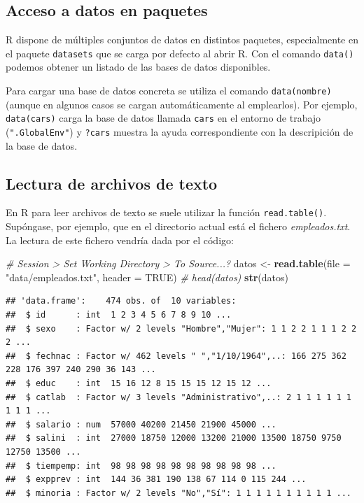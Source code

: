 \documentclass[]{book}
\newenvironment{Shaded}{\begin{snugshade}}{\end{snugshade}}
\newcommand{\CommentTok}[1]{\textcolor[rgb]{0.56,0.35,0.01}{\textit{#1}}}
\newcommand{\DataTypeTok}[1]{\textcolor[rgb]{0.13,0.29,0.53}{#1}}
\newcommand{\KeywordTok}[1]{\textcolor[rgb]{0.13,0.29,0.53}{\textbf{#1}}}
\newcommand{\NormalTok}[1]{#1}
\newcommand{\OtherTok}[1]{\textcolor[rgb]{0.56,0.35,0.01}{#1}}
\newcommand{\StringTok}[1]{\textcolor[rgb]{0.31,0.60,0.02}{#1}}
\begin{document}
\hypertarget{acceso-a-datos-en-paquetes}{%
\subsection{Acceso a datos en paquetes}\label{acceso-a-datos-en-paquetes}}

R dispone de múltiples conjuntos de datos en distintos paquetes, especialmente en el paquete \texttt{datasets}
que se carga por defecto al abrir R.
Con el comando \texttt{data()} podemos obtener un listado de las bases de datos disponibles.

Para cargar una base de datos concreta se utiliza el comando
\texttt{data(nombre)} (aunque en algunos casos se cargan automáticamente al emplearlos).
Por ejemplo, \texttt{data(cars)} carga la base de datos llamada \texttt{cars} en el entorno de trabajo (\texttt{".GlobalEnv"})
y \texttt{?cars} muestra la ayuda correspondiente con la descripición de la base de datos.

\hypertarget{cap2-texto}{%
\subsection{Lectura de archivos de texto}\label{cap2-texto}}

En R para leer archivos de texto se suele utilizar la función \texttt{read.table()}.
Supóngase, por ejemplo, que en el directorio actual está el fichero
\emph{empleados.txt}. La lectura de este fichero vendría dada por el código:

\begin{Shaded}
\begin{Highlighting}[]
\CommentTok{# Session > Set Working Directory > To Source...?}
\NormalTok{datos <-}\StringTok{ }\KeywordTok{read.table}\NormalTok{(}\DataTypeTok{file =} \StringTok{"data/empleados.txt"}\NormalTok{, }\DataTypeTok{header =} \OtherTok{TRUE}\NormalTok{)}
\CommentTok{# head(datos)}
\KeywordTok{str}\NormalTok{(datos)}
\end{Highlighting}
\end{Shaded}

\begin{verbatim}
## 'data.frame':    474 obs. of  10 variables:
##  $ id      : int  1 2 3 4 5 6 7 8 9 10 ...
##  $ sexo    : Factor w/ 2 levels "Hombre","Mujer": 1 1 2 2 1 1 1 2 2 2 ...
##  $ fechnac : Factor w/ 462 levels " ","1/10/1964",..: 166 275 362 228 176 397 240 290 36 143 ...
##  $ educ    : int  15 16 12 8 15 15 15 12 15 12 ...
##  $ catlab  : Factor w/ 3 levels "Administrativo",..: 2 1 1 1 1 1 1 1 1 1 ...
##  $ salario : num  57000 40200 21450 21900 45000 ...
##  $ salini  : int  27000 18750 12000 13200 21000 13500 18750 9750 12750 13500 ...
##  $ tiempemp: int  98 98 98 98 98 98 98 98 98 98 ...
##  $ expprev : int  144 36 381 190 138 67 114 0 115 244 ...
##  $ minoria : Factor w/ 2 levels "No","Sí": 1 1 1 1 1 1 1 1 1 1 ...
\end{verbatim}
\end{document}

